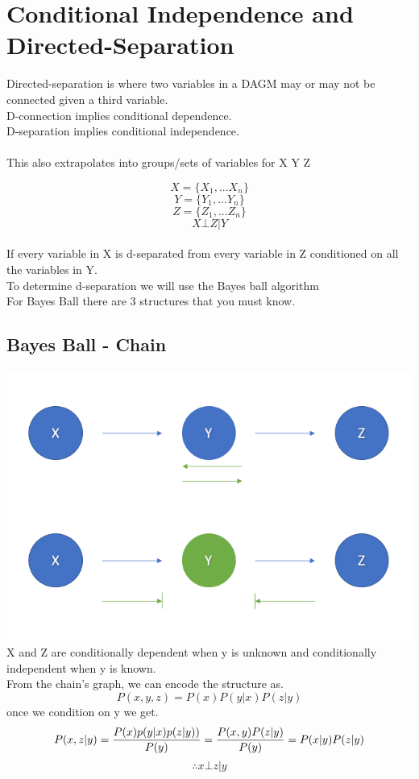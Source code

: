 \documentclass{article}
\begin{document}
\section{Conditional Independence and Directed-Separation }
Directed-separation is where two variables in a DAGM may or may not be connected given a third variable.\\
D-connection implies conditional dependence.\\
D-separation implies conditional independence.\\
\\
This also extrapolates into groups/sets of variables for X Y Z

$$X = \{X_1, ...X_n\}$$
$$Y = \{Y_1, ...Y_n\}$$
$$Z = \{Z_1, ...Z_n\}$$
$$X \bot Z | Y$$\\
If every variable in X is d-separated from every variable in Z conditioned on all the variables in Y.\\
To determine d-separation we will use the Bayes ball algorithm\\

For Bayes Ball there are 3 structures that you must know.

\subsection{Bayes Ball - Chain}
\includegraphics[scale=0.7]{Screenshot_7.png}\\

X and Z are conditionally dependent when y is unknown and conditionally independent when y is known.\\
From the chain's graph, we  can encode the structure as.
$$P(x, y, z) = P(x)P(y|x)P(z|y)$$
once we condition on y we get.
$$
P(x, z | y) = \frac{P(x)p(y|x)p(z|y))}{P(y)} \\
= \frac{P(x, y)P(z|y)}{P(y)} \\
= P(x | y) P(z | y) \\ 
$$
$$\therefore  x \bot z | y$$
\end{document}
